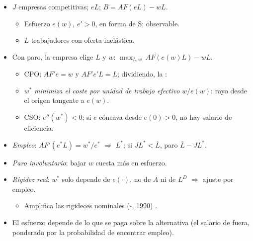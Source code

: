\documentclass{article}
\begin{document}
\begin{columnas}
\begin{itemize}
\item $J$ empresas competitivas;  $eL$; $B=AF(eL)-wL$.
  \begin{itemize}
  \item Esfuerzo $e(w)$, $e'>0$, en forma de S; observable.
  \item $\overline{L}$ trabajadores con oferta inelástica.
  \end{itemize}
\item Con paro, la empresa elige $L$ y $w$: $\max_{L,w}\ AF(e(w)L)-wL$.
  \begin{itemize}
  \item CPO: $AF'e=w$ y $AF'e'L=L$; dividiendo, la :
  \item $w^*$ \emph{minimiza el coste por unidad de trabajo efectivo} $w/e(w)$: rayo desde el origen tangente a $e(w)$.
  \item CSO: $e''(w^*)<0$; si $e$ cóncava desde $e(0)>0$, no hay salario de eficiencia.
  \end{itemize}
\item \emph{Empleo}: $AF'(e^*L)=w^*/e^*$ $\Rightarrow$ $L^*$; si $JL^*<\overline{L}$, paro $\overline{L}-JL^*$.
\end{itemize}
\begin{itemize}
\item \emph{Paro involuntario}: bajar $w$ cuesta más en esfuerzo.
\item \emph{Rigidez real}: $w^*$ solo depende de $e(\cdot)$, no de $A$ ni de $L^D$ $\Rightarrow$ ajuste por empleo.
  \begin{itemize}
  \item Amplifica las rigideces nominales (-, 1990) .
  \end{itemize}
\end{itemize}
\begin{itemize}
\item El esfuerzo depende de lo que se paga sobre la alternativa (el salario de fuera, ponderado por la probabilidad de encontrar empleo).

\end{itemize}
\end{columnas}
\end{document}
